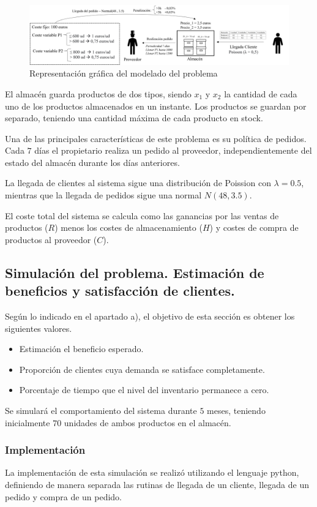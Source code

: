 \documentclass[a4paper,12pt]{article}
\begin{document}
	\begin{figure}[H]
		\centering
		\includegraphics[width=\textwidth]{include/modelo_almacen_v2.png}
		\caption{Representación gráfica del modelado del problema}
	\end{figure}
	
	El almacén guarda productos de dos tipos, siendo $x_1$ y $x_2$ la cantidad de cada uno de los productos almacenados en un instante. Los productos se guardan por separado, teniendo una cantidad máxima de cada producto en stock.
	
	Una de las principales características de este problema es su política de pedidos. Cada $7$ días el propietario realiza un pedido al proveedor, independientemente del estado del almacén durante los días anteriores.
	
	La llegada de clientes al sistema sigue una distribución de Poission con $\lambda = 0.5$, mientras que la llegada de pedidos sigue una normal $N(48, 3.5)$.
	
	El coste total del sistema se calcula como las ganancias por las ventas de productos ($R$) menos los costes de almacenamiento ($H$) y costes de compra de productos al proveedor ($C$).
	
	
	
	\subsection{Simulación del problema. Estimación de beneficios y satisfacción de clientes.}
	Según lo indicado en el apartado a), el objetivo de esta sección es obtener los siguientes valores.
	\begin{itemize}
		\item Estimación el beneficio esperado.
		\item Proporción de clientes cuya demanda se satisface completamente.
		\item Porcentaje de tiempo que el nivel del inventario permanece a cero.
	\end{itemize}
	Se simulará el comportamiento del sistema durante $5$ meses, teniendo inicialmente $70$ unidades de ambos productos en el almacén.
	 	
	\subsubsection{Implementación}
	La implementación de esta simulación se realizó utilizando el lenguaje python, definiendo de manera separada las rutinas de llegada de un cliente, llegada de un pedido y compra de un pedido.
	
\end{document}
